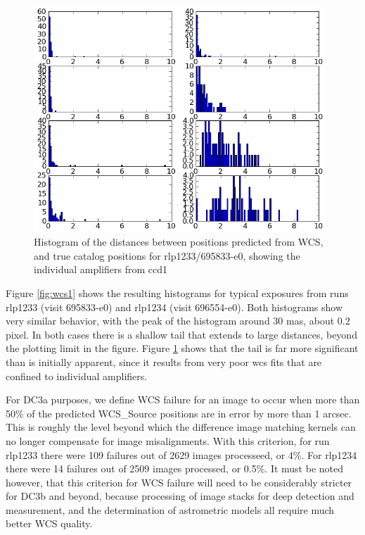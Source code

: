 \begin{figure}[p]
\begin{center}
\includegraphics[height=3.35in]{images/rlp1233_ccd1_match.png}
\caption{Histogram of the distances between positions predicted from WCS, and
  true catalog positions for rlp1233/695833-e0, showing the individual
amplifiers from ccd1}  
\label{fig:wcs2}
\end{center}
\end{figure}

Figure \ref{fig:wcs1} shows the resulting histograms for typical
exposures from runs rlp1233 (visit 695833-e0) and rlp1234 (visit
696554-e0). Both histograms show very similar behavior, with the peak
of the histogram around 30 mas, about 0.2 pixel.  In both cases there
is a shallow tail that extends to large distances, beyond the plotting
limit in the figure.  Figure \ref{fig:wcs2} shows that the tail is
far more significant than is initially apparent, since it
results from very poor wcs fits that are confined to individual
amplifiers.

For DC3a purposes, we define WCS failure for an image to occur when
more than 50\% of the predicted WCS\_Source positions are in error by
more than 1 arcsec.  This is roughly the level beyond which the difference
image matching kernels can no longer compensate for image misalignments. With
this criterion, for run rlp1233 there were 109 failures out of 2629
images processeed, or 4\%.   For rlp1234 there were 14 failures out
of 2509 images processed, or 0.5\%.  It must be noted however, that
this criterion for WCS failure will need to be considerably stricter
for DC3b and beyond, because processing of image stacks for deep
detection and measurement, and the determination of astrometric models
all require much better WCS quality.

